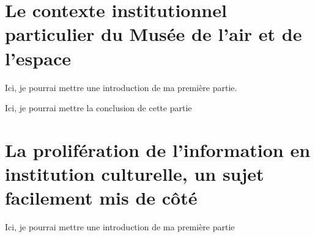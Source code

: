 \documentclass[12pt,twoside]{book}
\begin{document}
 


\nocite{*}


\newpage{\pagestyle{empty}\cleardoublepage}


	\mainmatter


	\part{Le contexte institutionnel particulier du Musée de l'air et de l'espace}


Ici, je pourrai mettre une introduction de ma première partie.


 



Ici, je pourrai mettre la conclusion de cette partie

	
	\part{La prolifération de l’information en institution culturelle, un sujet facilement mis de côté}
	

	Ici, je pourrai mettre une introduction de ma première partie
	
	
\end{document}
